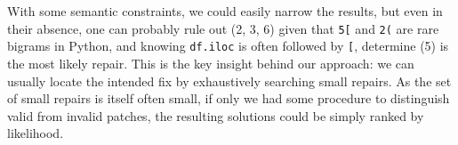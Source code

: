 \begin{figure}[H]
    \vspace{-10pt}
\end{figure}

With some semantic constraints, we could easily narrow the results, but even in their absence, one can probably rule out (2, 3, 6) given that \texttt{5[} and \texttt{2(} are rare bigrams in Python, and knowing \texttt{df.iloc} is often followed by \texttt{[}, determine (5) is the most likely repair. This is the key insight behind our approach: we can usually locate the intended fix by exhaustively searching small repairs. As the set of small repairs is itself often small, if only we had some procedure to distinguish valid from invalid patches, the resulting solutions could be simply ranked by likelihood.

